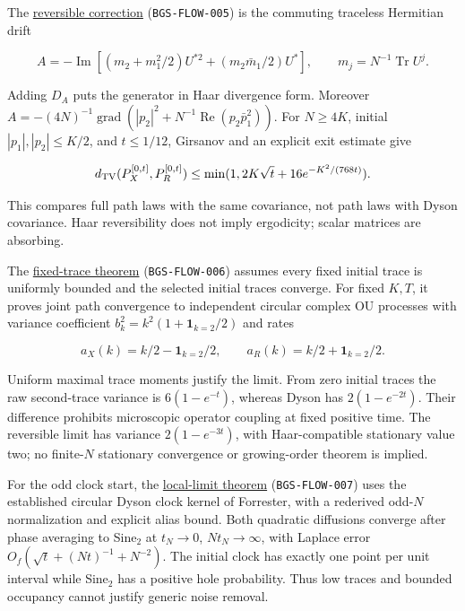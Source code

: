 The \href{https://github.com/ChurilovMaksim/BGS/blob/main/mathematics/quadratic_noise_reversibility.md}{reversible correction}
(\texttt{BGS-FLOW-005}) is the commuting traceless Hermitian drift

\[
A=-\operatorname{Im}[(m_2+m_1^2/2)U^{*2}+(m_2\bar m_1/2)U^*],
\qquad m_j=N^{-1}\operatorname{Tr}U^j.
\]

Adding \(D_A\) puts the generator in Haar divergence form. Moreover
\(A=-(4N)^{-1}\operatorname{grad}(|p_2|^2+N^{-1}\operatorname{Re}(p_2\bar p_1^2))\).
For \(N\ge4K\), initial \(|p_1|,|p_2|\le K/2\), and \(t\le1/12\),
Girsanov and an explicit exit estimate give

\[
d_{\rm TV}(P_X^{[0,t]},P_R^{[0,t]})
\le\min(1,2K\sqrt t+16e^{-K^2/(768t)}).
\]

This compares full path laws with the same covariance, not path laws
with Dyson covariance. Haar reversibility does not imply ergodicity;
scalar matrices are absorbing.

The \href{https://github.com/ChurilovMaksim/BGS/blob/main/mathematics/quadratic_noise_trace_fluctuations.md}{fixed-trace theorem}
(\texttt{BGS-FLOW-006}) assumes every fixed initial trace is uniformly bounded
and the selected initial traces converge. For fixed \(K,T\), it proves
joint path convergence to independent circular complex OU processes
with variance coefficient \(b_k^2=k^2(1+\mathbf1_{k=2}/2)\) and rates

\[
a_X(k)=k/2-\mathbf1_{k=2}/2,\qquad
a_R(k)=k/2+\mathbf1_{k=2}/2.
\]

Uniform maximal trace moments justify the limit. From zero initial
traces the raw second-trace variance is \(6(1-e^{-t})\), whereas Dyson
has \(2(1-e^{-2t})\). Their difference prohibits microscopic operator
coupling at fixed positive time. The reversible limit has variance
\(2(1-e^{-3t})\), with Haar-compatible stationary value two; no finite-\(N\)
stationary convergence or growing-order theorem is implied.

For the odd clock start, the \href{https://github.com/ChurilovMaksim/BGS/blob/main/mathematics/quadratic_noise_clock_limit.md}{local-limit theorem}
(\texttt{BGS-FLOW-007}) uses the established circular Dyson clock kernel of
Forrester, with a rederived odd-\(N\) normalization and explicit alias
bound. Both quadratic diffusions converge after phase averaging to
Sine\(_2\) at \(t_N\to0\), \(Nt_N\to\infty\), with Laplace error
\(O_f(\sqrt t+(Nt)^{-1}+N^{-2})\). The initial clock has exactly one point
per unit interval while Sine\(_2\) has a positive hole probability.
Thus low traces and bounded occupancy cannot justify generic noise removal.

